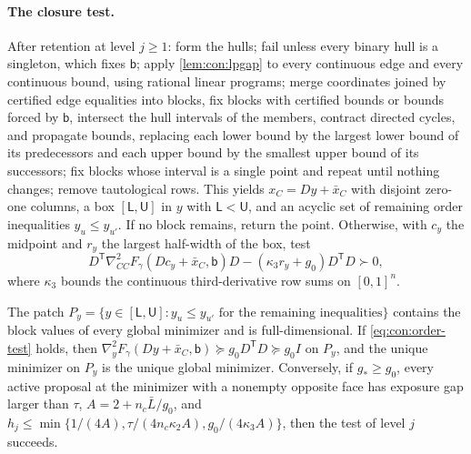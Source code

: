 \paragraph{The closure test.} After retention at level $j\ge1$: form the hulls;
fail unless every binary hull is a singleton, which fixes $\mathsf b$; apply
\cref{lem:con:lpgap} to every continuous edge and every continuous bound,
using rational linear programs; merge coordinates joined by certified edge
equalities into blocks, fix blocks with certified bounds or bounds forced by
$\mathsf b$, intersect the hull intervals of the members, contract directed
cycles, and propagate bounds, replacing each lower bound by the largest lower
bound of its predecessors and each upper bound by the smallest upper bound of
its successors; fix blocks whose interval is a single point and repeat until
nothing changes; remove tautological rows. This yields $x_C=Dy+\bar x_C$
with disjoint zero-one columns, a box $[\mathsf L,\mathsf U]$ in $y$ with
$\mathsf L<\mathsf U$, and an acyclic set of remaining order inequalities
$y_u\le y_{u'}$. If no block remains, return the point. Otherwise, with $c_y$
the midpoint and $r_y$ the largest half-width of the box, test
\begin{equation}\label{eq:con:order-test}
 D^{\mathsf T}\nabla^2_{CC}F_\gamma(Dc_y+\bar x_C,\mathsf b)D
 -(\kappa_3r_y+g_0)D^{\mathsf T}D\succ0,
\end{equation}
where $\kappa_3$ bounds the continuous third-derivative row sums on
$[0,1]^n$.

\begin{lemma}\label{lem:con:order-close}
The patch $P_y=\{y\in[\mathsf L,\mathsf U]:y_u\le y_{u'}\text{ for the remaining
inequalities}\}$ contains the block values of every global minimizer and is
full-dimensional. If \eqref{eq:con:order-test} holds, then
$\nabla^2_yF_\gamma(Dy+\bar x_C,\mathsf b)\succeq g_0D^{\mathsf T}D\succeq g_0I$ on
$P_y$, and the unique minimizer on $P_y$ is the unique global minimizer.
Conversely, if $g_*\ge g_0$, every active proposal at the minimizer with a
nonempty opposite face has exposure gap larger than $\tau$, $A=2+n_c\bar
L/g_0$, and $h_j\le\min\{1/(4A),\tau/(4n_c\kappa_2A),g_0/(4\kappa_3A)\}$, then the
test of level $j$ succeeds.
\end{lemma}

